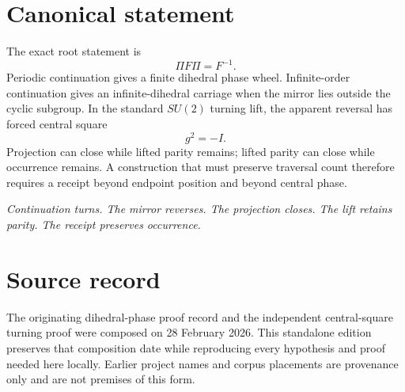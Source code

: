 \documentclass[11pt]{article}
\begin{document}
\section{Canonical statement}
The exact root statement is
\[
\boxed{\Pi F\Pi=F^{-1}.}
\]
Periodic continuation gives a finite dihedral phase wheel. Infinite-order continuation gives an infinite-dihedral carriage when the mirror lies outside the cyclic subgroup. In the standard $SU(2)$ turning lift, the apparent reversal has forced central square
\[
\boxed{g^2=-I.}
\]
Projection can close while lifted parity remains; lifted parity can close while occurrence remains. A construction that must preserve traversal count therefore requires a receipt beyond endpoint position and beyond central phase.

\begin{center}
\emph{Continuation turns. The mirror reverses. The projection closes. The lift retains parity. The receipt preserves occurrence.}
\end{center}

\section*{Source record}
The originating dihedral-phase proof record and the independent central-square turning proof were composed on 28 February 2026. This standalone edition preserves that composition date while reproducing every hypothesis and proof needed here locally. Earlier project names and corpus placements are provenance only and are not premises of this form.
\end{document}
